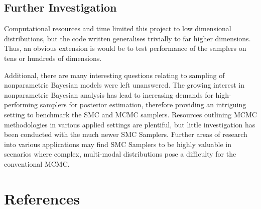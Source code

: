 \documentclass[12pt]{elsarticle}
\begin{document}
\subsection*{Further Investigation}
Computational resources and time limited this project to low dimensional distributions, but the code written generalises trivially to far higher dimensions. Thus, an obvious extension is would be to test performance of the samplers on tens or hundreds of dimensions.

Additional, there are  many interesting questions relating to sampling of nonparametric Bayesian models were left unanswered. The growing interest in nonparametric Bayesian analysis has lead to increasing demands for high-performing samplers for posterior estimation, therefore providing an intriguing setting to benchmark the SMC and MCMC samplers. Resources outlining MCMC methodologies in various applied settings are plentiful, but little investigation has been conducted with the much newer SMC Samplers. Further areas of research into various applications may find SMC Samplers to be highly valuable in scenarios where complex, multi-modal distributions pose a difficulty for the conventional MCMC.


\section*{References}
%
\nocite{Bishop2007}
\nocite{Murphy2012}
\nocite{Lindsten2014}
\nocite{Andrieu2003}


\end{document}
